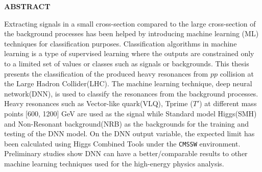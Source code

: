 \begin{center}
{\large {\bf  ABSTRACT }}

\end{center}  


 

Extracting signals in a small cross-section compared to the large cross-section of the background processes has been helped by introducing machine learning (ML) techniques for classification purposes. Classification algorithms in machine learning is a type of supervised learning where the outputs are constrained only to a limited set of values or classes such as signals or backgrounds. This thesis presents the classification of the produced heavy resonances from $pp$ collision at the Large Hadron Collider(LHC). The machine learning technique, deep neural network(DNN), is used to classify the resonances from the background processes. Heavy resonances such as Vector-like quark(VLQ), Tprime ($T'$) at different mass points [600, 1200] GeV are used as the signal while Standard model Higgs(SMH) and Non-Resonant background(NRB) as the backgrounds for the training and testing of the DNN model. On the DNN output variable, the expected limit has been calculated using Higgs Combined Tools under the \texttt{CMSSW} environment. Preliminary studies show DNN can have a better/comparable results to other machine learning techniques used for the high-energy physics analysis.